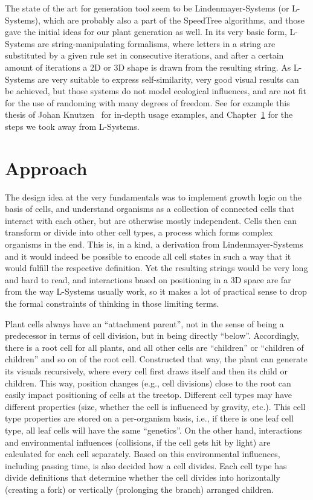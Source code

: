 \documentclass[11pt, abstract=on]{scrartcl}
\begin{document}
The state of the art for generation tool seem to be Lindenmayer-Systems (or L-Systems), which are probably also a part of the SpeedTree algorithms, and those gave the initial ideas for our plant generation as well. In its very basic form, L-Systems are string-manipulating formalisms, where letters in a string are substituted by a given rule set in consecutive iterations, and after a certain amount of iterations a 2D or 3D shape is drawn from the resulting string. As L-Systems are very suitable to express self-similarity, very good visual results can be achieved, but those systems do not model ecological influences, and are not fit for the use of randoming with many degrees of freedom. See for example this thesis of Johan Knutzen~\cite{ClimbingPlants} for in-depth usage examples, and Chapter~\ref{cpt:ImplGeneral} for the steps we took away from L-Systems.

\section{Approach}\label{cpt:ImplGeneral}
The design idea at the very fundamentals was to implement growth logic on the basis of cells, and understand organisms as a collection of connected cells that interact with each other, but are otherwise mostly independent. Cells then can transform or divide into other cell types, a process which forms complex organisms in the end. This is, in a kind, a derivation from Lindenmayer-Systems and it would indeed be possible to encode all cell states in such a way that it would fulfill the respective definition. Yet the resulting strings would be very long and hard to read, and interactions based on positioning in a 3D space are far from the way L-Systems usually work, so it makes a lot of practical sense to drop the formal constraints of thinking in those limiting terms. 

Plant cells always have an ``attachment parent'', not in the sense of being a predecessor in terms of cell division, but in being directly ``below''. Accordingly, there is a root cell for all plants, and all other cells are ``children'' or ``children of children'' and so on of the root cell. Constructed that way, the plant can generate its visuals recursively, where every cell first draws itself and then its child or children. This way, position changes (e.g., cell divisions) close to the root can easily impact positioning of cells at the treetop. Different cell types may have different properties (size, whether the cell is influenced by gravity, etc.). This cell type properties are stored on a per-organism basis, i.e., if there is one leaf cell type, all leaf cells will have the same ``genetics''. On the other hand, interactions and environmental influences (collisions, if the cell gets hit by light) are calculated for each cell separately. Based on this environmental influences, including passing time, is also decided how a cell divides. Each cell type has divide definitions that determine whether the cell divides into horizontally (creating a fork) or vertically (prolonging the branch) arranged children.
\end{document}
